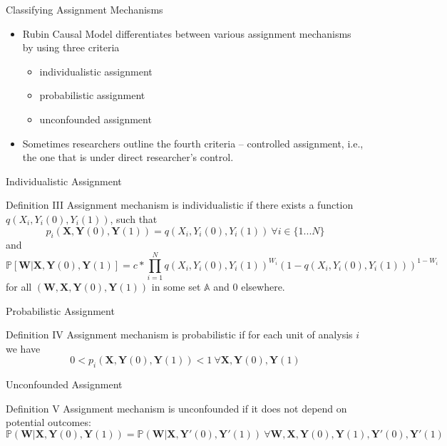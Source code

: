\documentclass{beamer}
\begin{document}
\begin{frame}{Classifying Assignment Mechanisms}
\begin{itemize}
\item Rubin Causal Model differentiates between various assignment mechanisms by using three criteria
\begin{itemize}
\item individualistic assignment
\item probabilistic assignment
\item unconfounded assignment
\end{itemize}
\item Sometimes researchers outline the fourth criteria -- controlled assignment, i.e., the one that is under direct researcher's control. 
\end{itemize}
\end{frame}
\begin{frame}{Individualistic Assignment}
\begin{block}{Definition III}
Assignment mechanism is individualistic if there exists a function $q(X_i, Y_i(0), Y_i(1))$, such that $$p_i(\mathbf{X},\mathbf{Y}(0),\mathbf{Y}(1)) = q(X_i, Y_i(0), Y_i(1)) \ \forall i \in \{1 ... N\}$$ 
and
\small
$$\mathbb{P}[\mathbf{W}|\mathbf{X},\mathbf{Y}(0),\mathbf{Y}(1)] = c * \prod_{i=1}^{N}q(X_i,Y_i(0),Y_i(1))^{W_i}(1 - q(X_i, Y_i(0), Y_i(1)))^{1 - W_i}$$
for all $(\mathbf{W}, \mathbf{X}, \mathbf{Y}(0), \mathbf{Y}(1))$ in some set $\mathbb{A}$ and 0 elsewhere.
\end{block}
\end{frame}
\begin{frame}{Probabilistic Assignment}
\begin{block}{Definition IV}
Assignment mechanism is probabilistic if for each unit of analysis $i$ we have $$0 < p_i(\mathbf{X},\mathbf{Y}(0),\mathbf{Y}(1)) < 1 \ \forall \mathbf{X},\mathbf{Y}(0),\mathbf{Y}(1)$$
\end{block}
\end{frame}
\begin{frame}{Unconfounded Assignment}
\small
\begin{block}{Definition V}
Assignment mechanism is unconfounded if it does not depend on potential outcomes: $$\mathbb{P}(\mathbf{W}|\mathbf{X},\mathbf{Y}(0),\mathbf{Y}(1)) = \mathbb{P}(\mathbf{W}|\mathbf{X},\mathbf{Y}'(0),\mathbf{Y}'(1)) \ \forall \mathbf{W}, \mathbf{X}, \mathbf{Y}(0), \mathbf{Y}(1), \mathbf{Y}'(0), \mathbf{Y}'(1)$$
\end{block}
\end{frame}
\end{document}

